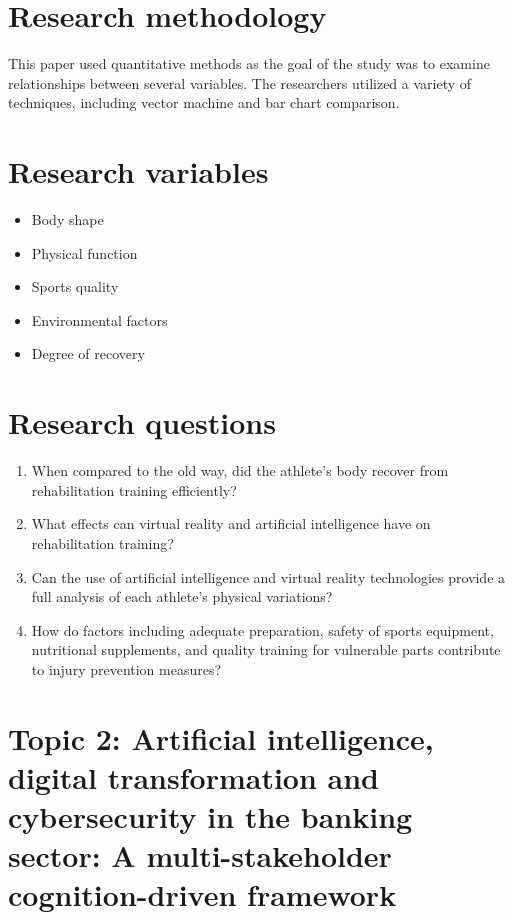 \documentclass{article}
\begin{document}
\section*{Research methodology}
This paper used quantitative methods as the goal of the study was to examine relationships between several variables. The researchers utilized a variety of techniques, including vector machine and bar chart comparison.
\section*{Research variables}
\begin{itemize}
  \item Body shape
  \item Physical function
  \item Sports quality
  \item Environmental factors
  \item Degree of recovery
\end{itemize}
\section*{Research questions}
\begin{enumerate}
  \item When compared to the old way, did the athlete's body recover from rehabilitation training efficiently?
  \item What effects can virtual reality and artificial intelligence have on rehabilitation training?
  \item Can the use of artificial intelligence and virtual reality technologies provide a full analysis of each athlete's physical variations?
  \item How do factors including adequate preparation, safety of sports equipment, nutritional supplements, and quality training for vulnerable parts contribute to injury prevention measures?
\end{enumerate}
\pagebreak
\section*{Topic 2: Artificial intelligence, digital transformation and cybersecurity in the banking sector: A multi-stakeholder cognition-driven framework}
\end{document}
